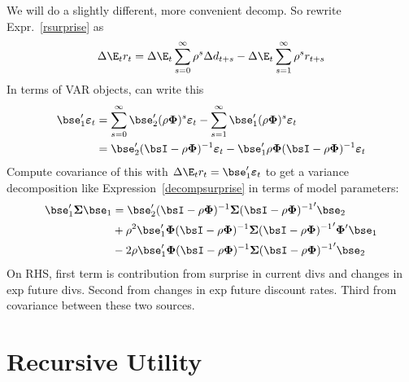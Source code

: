 \documentclass[12pt]{article}
\theoremstyle{plain}
\theoremstyle{definition}
\theoremstyle{remark}
\newcommand{\bsSigma}{\boldsymbol{\Sigma}}
\newcommand{\bsvarepsilon}{\boldsymbol{\varepsilon}}
\newcommand{\bsPhi}{\boldsymbol{\Phi}}
\begin{document}
\begin{multicols*}{2}
We will do a slightly different, more convenient decomp.
So rewrite Expr.~\ref{rsurprise} as
\begin{align*}
  \Delta\E_tr_{t}
  =
  \Delta \E_t \sum_{s=0}^\infty \rho^{s}\Delta d_{t+s}
  - \Delta \E_t \sum_{s=1}^\infty \rho^{s}r_{t+s}
\end{align*}
In terms of VAR objects, can write this
\begin{align*}
  \bse_1'\bsvarepsilon_t
  &=
  \sum_{s=0}^\infty \bse_2'(\rho\bsPhi)^{s}\bsvarepsilon_t
  - \sum_{s=1}^\infty \bse_1'(\rho\bsPhi)^{s}\bsvarepsilon_t
  \\
  &=
  \bse_2'
  (\bsI-\rho\bsPhi)^{-1}
  \bsvarepsilon_t
  -\bse_1'\rho\bsPhi
  (\bsI-\rho\bsPhi)^{-1}
  \bsvarepsilon_t
\end{align*}
Compute covariance of this with
$\Delta\E_tr_t=\bse_1'\bsvarepsilon_t$ to get a variance decomposition
like Expression~\ref{decompsurprise} in terms of model parameters:
\begin{align*}
  \bse_1'\bsSigma\bse_1
  &=
  \bse_2'
  (\bsI-\rho\bsPhi)^{-1}
  \bsSigma
  {(\bsI-\rho\bsPhi)^{-1}}'
  \bse_2
  \\
  &
  +\rho^2\bse_1'\bsPhi
  (\bsI-\rho\bsPhi)^{-1}
  \bsSigma
  {(\bsI-\rho\bsPhi)^{-1}}'
  \bsPhi'\bse_1
  \\
  &
  -
  2\rho
  \bse_1'
  \bsPhi
  (\bsI-\rho\bsPhi)^{-1}
  \bsSigma
  {(\bsI-\rho\bsPhi)^{-1}}'
  \bse_2
\end{align*}
On RHS, first term is contribution from surprise in current divs and
changes in exp future divs.
Second from changes in exp future discount rates.
Third from covariance between these two sources.


\clearpage
\section{Recursive Utility}


\end{multicols*}
\end{document}

